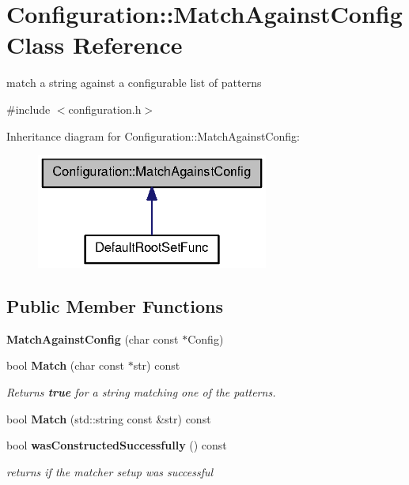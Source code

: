 \section{\-Configuration\-:\-:\-Match\-Against\-Config \-Class \-Reference}
\label{classConfiguration_1_1MatchAgainstConfig}


match a string against a configurable list of patterns  




{\ttfamily \#include $<$configuration.\-h$>$}



\-Inheritance diagram for \-Configuration\-:\-:\-Match\-Against\-Config\-:
\nopagebreak
\begin{figure}[H]
\begin{center}
\leavevmode
\includegraphics[width=216pt]{classConfiguration_1_1MatchAgainstConfig__inherit__graph}
\end{center}
\end{figure}
\subsection*{\-Public \-Member \-Functions}
\begin{DoxyCompactItemize}
\item 
{\bfseries \-Match\-Against\-Config} (char const $\ast$\-Config)\label{classConfiguration_1_1MatchAgainstConfig_a8e30a03017fa065528a0ee990acf2630}

\item 
bool {\bf \-Match} (char const $\ast$str) const \label{classConfiguration_1_1MatchAgainstConfig_a6b22196d9933bb73b60e258c2a8263b3}

\begin{DoxyCompactList}\small\item\em \-Returns {\bfseries true} for a string matching one of the patterns. \end{DoxyCompactList}\item 
bool {\bfseries \-Match} (std\-::string const \&str) const \label{classConfiguration_1_1MatchAgainstConfig_a90dddfec352e443020facad47dbcedff}

\item 
bool {\bf was\-Constructed\-Successfully} () const \label{classConfiguration_1_1MatchAgainstConfig_a11c0574ab1e133bbd8d07b7f18f41d29}

\begin{DoxyCompactList}\small\item\em returns if the matcher setup was successful \end{DoxyCompactList}\end{DoxyCompactItemize}


